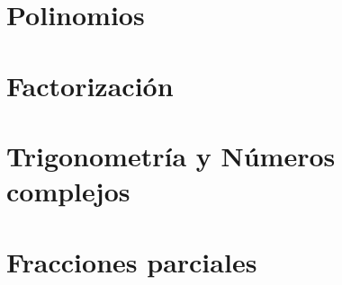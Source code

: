\documentclass{tufte-book}
\begin{document}
\chapter{Polinomios}








\chapter{Factorización}







\chapter{Trigonometría y Números complejos}




\chapter{Fracciones parciales}




%
{}

\end{document}
